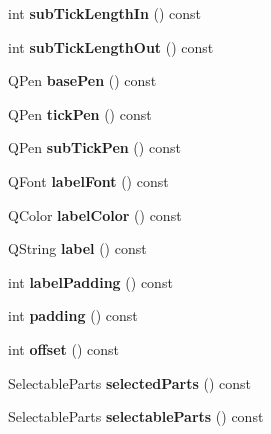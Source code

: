 \begin{DoxyCompactItemize}
int {\bfseries sub\+Tick\+Length\+In} () const
\item 
\mbox{\label{classQCPAxis_ac98c66cae50c98f3ae90e2969382976d}} 
int {\bfseries sub\+Tick\+Length\+Out} () const
\item 
\mbox{\label{classQCPAxis_a216974be018e73008b3cf6d033c1325d}} 
Q\+Pen {\bfseries base\+Pen} () const
\item 
\mbox{\label{classQCPAxis_affd022d4f56dfc575b4ced95ad417860}} 
Q\+Pen {\bfseries tick\+Pen} () const
\item 
\mbox{\label{classQCPAxis_a7a89df74ba427fac311bf4cc92fbddca}} 
Q\+Pen {\bfseries sub\+Tick\+Pen} () const
\item 
\mbox{\label{classQCPAxis_aa7b465fe233f1878793954ba5ab9c47e}} 
Q\+Font {\bfseries label\+Font} () const
\item 
\mbox{\label{classQCPAxis_a05794f13d322da7fd9d5554d11186b0e}} 
Q\+Color {\bfseries label\+Color} () const
\item 
\mbox{\label{classQCPAxis_a32ba4d3effcddd8af3bc49f405e1d53e}} 
Q\+String {\bfseries label} () const
\item 
\mbox{\label{classQCPAxis_a6d9a9fe1c7166f209fb1e25686390451}} 
int {\bfseries label\+Padding} () const
\item 
\mbox{\label{classQCPAxis_a07df379d5c017b8f3a4702532eb037b2}} 
int {\bfseries padding} () const
\item 
\mbox{\label{classQCPAxis_aef66fa16353b4993b1cceabfb644a1a9}} 
int {\bfseries offset} () const
\item 
\mbox{\label{classQCPAxis_a893e8d6cfed9267eb2b793cb1d2b4dce}} 
Selectable\+Parts {\bfseries selected\+Parts} () const
\item 
\mbox{\label{classQCPAxis_a1d12d157756c114f4e57517c62177181}} 
Selectable\+Parts {\bfseries selectable\+Parts} () const
\item 

\end{DoxyCompactItemize}
